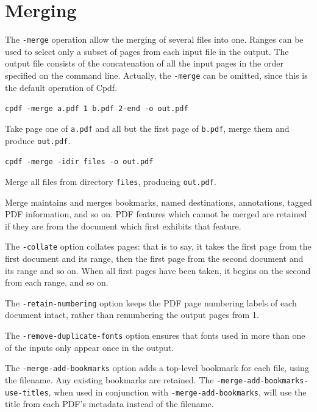 \documentclass{book}
\begin{document}
  \vspace{12mm}
  \section{Merging}
  The \texttt{-merge} operation allow the merging of several files into one.
Ranges can be used to select only a subset of pages from each
input file in the output. The output file consists of the concatenation of all
the input pages in the order specified on the command line. Actually, the
\texttt{-merge} can be omitted, since this is the default operation of Cpdf.

  \begin{framed}\small
    \noindent\verb!cpdf -merge a.pdf 1 b.pdf 2-end -o out.pdf!

    \vspace{2.5mm}
    \noindent Take page one of \texttt{a.pdf} and all but the first page of
\texttt{b.pdf}, merge them and produce \texttt{out.pdf}.

    \vspace{1.5mm}
    \noindent\verb!cpdf -merge -idir files -o out.pdf!

    \vspace{2.5mm}
    \noindent Merge all files from directory \texttt{files}, producing \texttt{out.pdf}.

  \end{framed}

\noindent Merge maintains and merges bookmarks, named destinations, annotations, tagged PDF information, and so on. PDF features which cannot be merged are retained if they are from
the document which first exhibits that feature.

The \texttt{-collate} option collates pages: that is to say, it takes the first page from the first document and its range, then the first page from the second document and its range and so on. When all first pages have been taken, it begins on the second from each range, and so on.

The \texttt{-retain-numbering} option keeps the PDF page numbering labels of
each document intact, rather than renumbering the output pages from 1.

The \texttt{-remove-duplicate-fonts} option ensures that fonts used in more than one
of the inputs only appear once in the output.

The \texttt{-merge-add-bookmarks} option adds a top-level bookmark for each file, using the filename. Any existing bookmarks are retained. The \texttt{-merge\--add\--bookmarks\--use\--titles}, when used in conjunction with \texttt{-merge-add-bookmarks}, will use the title from each PDF's metadata instead of the filename.
\end{document}
